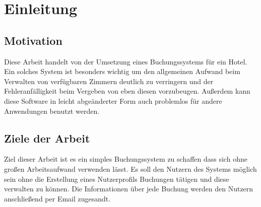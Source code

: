 \chapter{Einleitung}
\section{Motivation}
Diese Arbeit handelt von der Umsetzung eines Buchungssystems für ein Hotel. Ein solches System ist besonders wichtig um den allgemeinen Aufwand beim Verwalten von verfügbaren Zimmern deutlich zu verringern und der Fehleranfälligkeit beim Vergeben von eben diesen vorzubeugen. Außerdem kann diese Software in leicht abgeänderter Form auch problemlos für andere Anwendungen benutzt werden.


\section{Ziele der Arbeit}
Ziel dieser Arbeit ist es ein simples Buchungssystem zu schaffen dass sich ohne großen Arbeitsaufwand verwenden lässt. Es soll den Nutzern des Systems möglich sein ohne die Erstellung eines Nutzerprofils Buchungen tätigen und diese verwalten zu können. Die Informationen über jede Buchung werden den Nutzern anschließend per Email zugesandt.